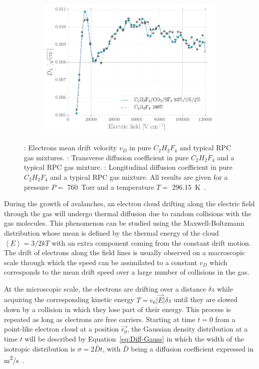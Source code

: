 \begin{figure}
\begin{subfigure}{\linewidth}
			\caption{\label{fig:Drift-Diff:B}}
		\end{subfigure}
		\begin{subfigure}{\linewidth}
			\centering
			\includegraphics[width = \linewidth]{fig/chapt3/Diff_Long.pdf}
			\caption{\label{fig:Drift-Diff:C}}
		\end{subfigure}
		\caption{\label{fig:Drift-Diff} : Electrons mean drift velocity $v_D$ in pure $C_2H_2F_4$ and typical RPC gas mixtures. : Transverse diffusion coefficient in pure $C_2H_2F_4$ and a typical RPC gas mixture. : Longitudinal diffusion coefficient in pure $C_2H_2F_4$ and a typical RPC gas mixture. All results are given for a pressure $P = $ \SI{760}{Torr} and a temperature $T =$ \SI{296.15}{K}~\cite{VINCENT2017}.}
	\end{figure}
	
	During the growth of avalanches, an electron cloud drifting along the electric field through the gas will undergo thermal diffusion due to random collisions with the gas molecules. This phenomenon can be studied using the Maxwell-Boltzmann distribution whose mean is defined by the thermal energy of the cloud $\left\langle E\right\rangle = 3/2 kT$ with an extra component coming from the constant drift motion. The drift of electrons along the field lines is usually observed on a macroscopic scale through which the speed can be assimilated to a constant $v_D$ which corresponds to the mean drift speed over a large number of collisions in the gas.
	
	At the microscopic scale, the electrons are drifting over a distance $\delta z$ while acquiring the corresponding kinetic energy $T = e_0 \vert\overrightarrow{E}\vert\delta z$ until they are slowed down by a collision in which they lose part of their energy. This process is repeated as long as electrons are free carriers. Starting at time $t=0$ from a point-like electron cloud at a position $\overrightarrow{r_0}$, the Gaussian density distribution at a time $t$ will be described by Equation~\ref{eq:Diff-Gauss} in which the width of the isotropic distribution is $\sigma = 2\bar{D}t$, with $\bar{D}$ being a diffusion coefficient expressed in \si{m^2/s}~\cite{LIPPMANN2003}.
	
